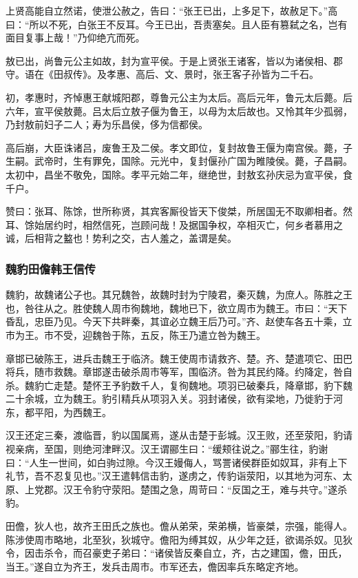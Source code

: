 \documentclass[]{article}
\begin{document}
上贤高能自立然诺，使泄公赦之，告曰：``张王已出，上多足下，故赦足下。''高曰：``所以不死，白张王不反耳。今王已出，吾责塞矣。且人臣有篡弑之名，岂有面目复事上哉！''乃仰绝亢而死。

敖已出，尚鲁元公主如故，封为宣平侯。于是上贤张王诸客，皆以为诸侯相、郡守。语在《田叔传》。及孝惠、高后、文、景时，张王客子孙皆为二千石。

初，孝惠时，齐悼惠王献城阳郡，尊鲁元公主为太后。高后元年，鲁元太后薨。后六年，宣平侯敖薨。吕太后立敖子偃为鲁王，以母为太后故也。又怜其年少孤弱，乃封敖前妇子二人；寿为乐昌侯，侈为信都侯。

高后崩，大臣诛诸吕，废鲁王及二侯。孝文即位，复封故鲁王偃为南宫侯。薨，子生嗣。武帝时，生有罪免，国除。元光中，复封偃孙广国为睢陵侯。薨，子昌嗣。太初中，昌坐不敬免，国除。孝平元始二年，继绝世，封敖玄孙庆忌为宣平侯，食千户。

赞曰：张耳、陈馀，世所称贤，其宾客厮役皆天下俊桀，所居国无不取卿相者。然耳、馀始居约时，相然信死，岂顾问哉！及据国争权，卒相灭亡，何乡者慕用之诚，后相背之盭也！势利之交，古人羞之，盖谓是矣。

\hypertarget{header-n3495}{%
\subsubsection{魏豹田儋韩王信传}\label{header-n3495}}

魏豹，故魏诸公子也。其兄魏咎，故魏时封为宁陵君，秦灭魏，为庶人。陈胜之王也，咎往从之。胜使魏人周市徇魏地，魏地已下，欲立周市为魏王。市曰：``天下昏乱，忠臣乃见。今天下共畔秦，其谊必立魏王后乃可。''齐、赵使车各五十乘，立市为王。市不受，迎魏咎于陈，五反，陈王乃遣立咎为魏王。

章邯已破陈王，进兵击魏王于临济。魏王使周市请救齐、楚。齐、楚遣项它、田巴将兵，随市救魏。章邯遂击破杀周市等军，围临济。咎为其民约降。约降定，咎自杀。魏豹亡走楚。楚怀王予豹数千人，复徇魏地。项羽已破秦兵，降章邯，豹下魏二十余城，立为魏王。豹引精兵从项羽入关。羽封诸侯，欲有梁地，乃徙豹于河东，都平阳，为西魏王。

汉王还定三秦，渡临晋，豹以国属焉，遂从击楚于彭城。汉王败，还至荥阳，豹请视亲病，至国，则绝河津畔汉。汉王谓郦生曰：``缓颊往说之。''郦生往，豹谢曰：``人生一世间，如白驹过隙。今汉王嫚侮人，骂詈诸侯群臣如奴耳，非有上下礼节，吾不忍复见也。''汉王遣韩信击豹，遂虏之，传豹诣荥阳，以其地为河东、太原、上党郡。汉王令豹守荥阳。楚围之急，周苛曰：``反国之王，难与共守。''遂杀豹。

田儋，狄人也，故齐王田氏之族也。儋从弟荣，荣弟横，皆豪桀，宗强，能得人。陈涉使周市略地，北至狄，狄城守。儋阳为缚其奴，从少年之廷，欲谒杀奴。见狄令，因击杀令，而召豪吏子弟曰：``诸侯皆反秦自立，齐，古之建国，儋，田氏，当王。''遂自立为齐王，发兵击周市。市军还去，儋因率兵东略定齐地。
\end{document}

